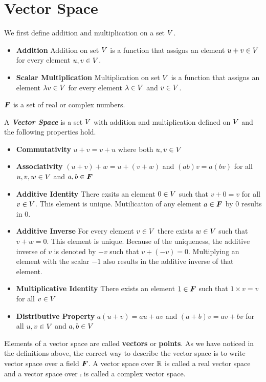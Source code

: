 \documentclass[../../linear_algebra.tex]{subfiles}
\begin{document}
\section{Vector Space}
We first define addition and multiplication on a set $V$.\newline
\begin{itemize}
    \item \textbf{Addition}\newline
    Addition on set $V$ is a function that assigns an element $u + v \in V$ for every element $u, v \in V$.
    \item \textbf{Scalar Multiplication}\newline
    Multiplication on set $V$ is a function that assigns an element $\lambda v \in V$ for every element $\lambda \in V$ and $v \in V$.
\end{itemize}

$\bm{F}$ is a set of real or complex numbers.\newline

A \emph{\textbf{Vector Space}} is a set $V$ with addition and multiplication defined on $V$ and the following properties hold.
\begin{itemize}
    \item \textbf{Commutativity}\newline
    $u + v = v + u$ where both $u,v \in V$
    \item \textbf{Associativity}\newline
    $(u + v) + w = u + (v + w)$ and $(ab)v = a(bv)$ for all $u,v,w \in V$ and $a,b \in \bm{F}$
    \item \textbf{Additive Identity}\newline
    There exsits an element $0 \in V$ such that $v + 0 = v$ for all $v \in V$. This element is unique. Mutilication of any element $a \in \bm{F}$ by $0$ results in $0$.
    \item \textbf{Additive Inverse}\newline
    For every element $v \in V$ there exists $w \in V$ such that $v + w = 0$. This element is unique. Because of the uniqueness, the additive inverse of $v$ is denoted by $-v$ such that $v + (-v) = 0$. Multiplying an element with the scalar $-1$ also results in the additive inverse of that element.
    \item \textbf{Multiplicative Identity}
    There exists an element $1 \in \bm{F}$ such that $1 \times v = v$ for all $v \in V$
    \item \textbf{Distributive Property}\newline
    $a(u + v) = au + av$ and $(a + b)v = av + bv$ for all $u,v \in V$ and $a,b \in V$
\end{itemize}

Elements of a vector space are called \textbf{vectors} or \textbf{points}. As we have noticed in the definitions above, the correct way to describe the vector space is to write vector space over a field $\bm{F}$. A vector space over $\mathbb{R}$ is called a real vector space and a vector space over $\comp$ is called a complex vector space.
\end{document}
